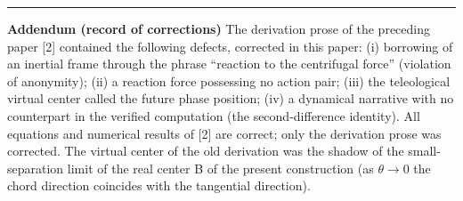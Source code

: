 \documentclass[
  a4paper,
]{article}
\begin{document}
\begin{center}\rule{0.5\linewidth}{0.5pt}\end{center}

\textbf{Addendum (record of corrections)} The derivation prose of the
preceding paper {[}2{]} contained the following defects, corrected in
this paper: (i) borrowing of an inertial frame through the phrase
``reaction to the centrifugal force'' (violation of anonymity); (ii) a
reaction force possessing no action pair; (iii) the teleological virtual
center called the future phase position; (iv) a dynamical narrative with
no counterpart in the verified computation (the second-difference
identity). All equations and numerical results of {[}2{]} are correct;
only the derivation prose was corrected. The virtual center of the old
derivation was the shadow of the small-separation limit of the real
center B of the present construction (as \(\theta\to0\) the chord
direction coincides with the tangential direction).
\end{document}

